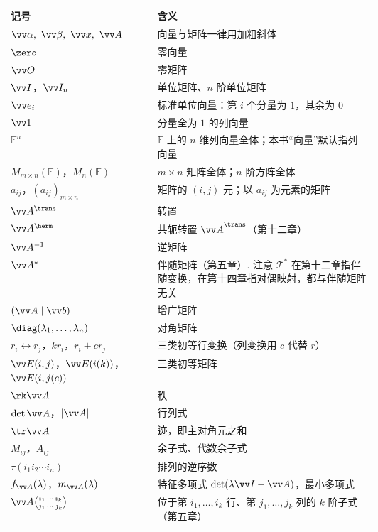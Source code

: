 \begin{center}
	\begin{longtable}{l>{\raggedright\arraybackslash}p{0.6\linewidth}}
		\toprule
		记号 & 含义 \\
		\midrule
		\endhead
		$\vv\alpha,\ \vv\beta,\ \vv x,\ \vv A$ & 向量与矩阵一律用加粗斜体 \\
		$\zero$ & 零向量 \\
		$\vv O$ & 零矩阵 \\
		$\vv I$，$\vv I_n$ & 单位矩阵、$n$ 阶单位矩阵 \\
		$\vv e_i$ & 标准单位向量：第 $i$ 个分量为 $1$，其余为 $0$ \\
		$\vv 1$ & 分量全为 $1$ 的列向量 \\
		$\mathbb{F}^n$ & $\mathbb{F}$ 上的 $n$ 维列向量全体；本书“向量”默认指列向量 \\
		$M_{m\times n}(\mathbb{F})$，$M_n(\mathbb{F})$ & $m\times n$ 矩阵全体；$n$ 阶方阵全体 \\
		$a_{ij}$，$(a_{ij})_{m\times n}$ & 矩阵的 $(i,j)$ 元；以 $a_{ij}$ 为元素的矩阵 \\
		$\vv A^\trans$ & 转置 \\
		$\vv A^{\herm}$ & 共轭转置 $\bar{\vv A}^\trans$（第十二章） \\
		$\vv A^{-1}$ & 逆矩阵 \\
		$\vv A^*$ & 伴随矩阵（第五章）. 注意 $\mathscr T^*$ 在第十二章指伴随变换，在第十四章指对偶映射，都与伴随矩阵无关 \\
		$(\vv A\mid\vv b)$ & 增广矩阵 \\
		$\diag(\lambda_1,\ldots,\lambda_n)$ & 对角矩阵 \\
		$r_i\leftrightarrow r_j$，$kr_i$，$r_i+cr_j$ & 三类初等行变换（列变换用 $c$ 代替 $r$） \\
		$\vv E(i,j)$，$\vv E(i(k))$，$\vv E(i,j(c))$ & 三类初等矩阵 \\
		$\rk\vv A$ & 秩 \\
		$\det\vv A$，$|\vv A|$ & 行列式 \\
		$\tr\vv A$ & 迹，即主对角元之和 \\
		$M_{ij}$，$A_{ij}$ & 余子式、代数余子式 \\
		$\tau(i_1i_2\cdots i_n)$ & 排列的逆序数 \\
		$f_{\vv A}(\lambda)$，$m_{\vv A}(\lambda)$ & 特征多项式 $\det(\lambda\vv I-\vv A)$，最小多项式 \\
		$\vv A\binom{i_1\,\cdots\,i_k}{j_1\,\cdots\,j_k}$ & 位于第 $i_1,\ldots,i_k$ 行、第 $j_1,\ldots,j_k$ 列的 $k$ 阶子式（第五章） \\

\end{longtable}
\end{center}
